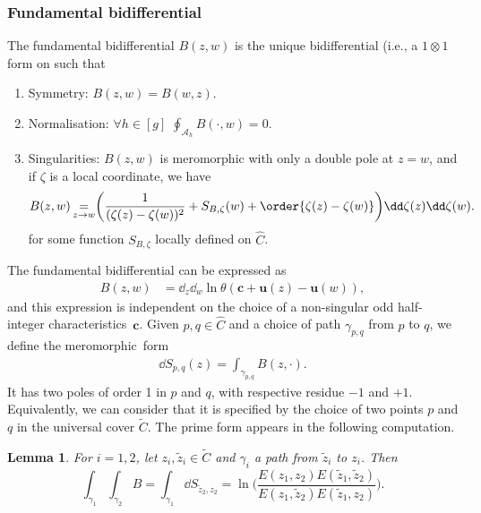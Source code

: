\documentclass[pdftex]{sigma}
\numberwithin{equation}{section}
\newtheorem{Lemma}[Theorem]{Lemma}
\newcommand{\A}{\mathcal{A}}
\begin{document}
\subsubsection{Fundamental bidifferential}
\begin{Definition}
 The fundamental bidifferential $B(z, w)$ is the unique bidifferential \big(i.e., a $1 \otimes 1$ form on  such that
 \begin{enumerate}\itemsep=0pt
 \item Symmetry: $B(z, w) = B(w, z)$.
 \item Normalisation: $\forall h \in [g]$ $\oint_{\A_{h}}B(\cdot, w) = 0$.
 \item Singularities: $B(z, w)$ is meromorphic with only a double pole at $z = w$, and if $\zeta$ is a local coordinate, we have
\[
 B(z, w) \mathop{=}_{z \rightarrow w} \biggl(\frac{1}{(\zeta(z) - \zeta(w))^{2}} + S_{B,\zeta}(w) + \order{\zeta(z) - \zeta(w)}\biggr)\dd \zeta(z) \dd \zeta(w).
\]
for some function $S_{B,\zeta}$ locally defined on $\widehat{C}$.
 \end{enumerate}
\end{Definition}

The fundamental bidifferential can be expressed as
\begin{equation*}
 \begin{split}
 B(z,w) &= \dd_{z}\dd_{w}\ln \theta(\bm{c} + \bm{u}(z) - \bm{u}(w)),
 \end{split}
\end{equation*}
and this expression is independent on the choice of a non-singular odd half-integer characteristics~$\bm{c}$. Given $p,q \in \widehat{C}$ and a choice of path $\gamma_{p,q}$ from $p$ to $q$, we define the meromorphic~form
\begin{equation*}
 \begin{split}
 \dd S_{p,q}(z) = \int_{\gamma_{p,q}} B(z, \cdot).
 \end{split}
\end{equation*}
It has two poles of order 1 in $p$ and $q$, with respective residue
$-1$ and $+1$. Equivalently, we can consider that it is specified by the choice of two points $p$ and $q$ in the universal cover $\widetilde{C}$. The prime form appears in the following computation.
\begin{Lemma}
\label{IntB} For $i = 1,2$, let $z_i,\tilde{z}_i \in \widetilde{C}$ and $\gamma_i$ a path from $\tilde{z}_i$ to $z_i$. Then
\[
\int_{\gamma_1} \int_{\gamma_2} B = \int_{\gamma_1} \dd S_{\tilde{z}_2,z_2} = \ln\biggl(\frac{E(z_1,z_2)E(\tilde{z}_1,\tilde{z}_2)}{E(z_1,\tilde{z}_2)E(\tilde{z}_1,z_2)}\biggr).
\]
\end{Lemma}
\end{document}

